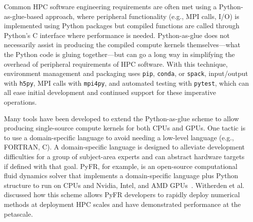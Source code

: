 Common HPC software engineering requirements are often met using a Python-as-glue-based approach, where peripheral functionality (e.g., MPI calls, I/O) is implemented using Python packages but compiled functions are called through Python's C interface where performance is needed.
Python-as-glue does not necessarily assist in producing the compiled compute kernels themselves---what the Python code is gluing together---but can go a long way in simplifying the overhead of peripheral requirements of HPC software.
With this technique, environment management and packaging uses \texttt{pip}, \texttt{conda}, or \texttt{spack}, input/output with \texttt{h5py}, MPI calls with \texttt{mpi4py}, 
and automated testing with \texttt{pytest}, which can all ease initial development and continued support for these imperative operations. 

Many tools have been developed to extend the Python-as-glue scheme to allow producing single-source compute kernels for both CPUs and GPUs.
One tactic is to use a domain-specific language to avoid needing a low-level language (e.g., FORTRAN, C).
A domain-specific language is designed to alleviate development difficulties for a group of subject-area experts and can abstract hardware targets if defined with that goal.
PyFR, for example, is an open-source computational fluid dynamics solver that implements a domain-specific language plus Python structure to run on CPUs and Nvidia, Intel, and AMD GPUs~\cite{pyfrPetascale}. 
Witherden et al.~\cite{pyfrPetascale} discussed how this scheme allows PyFR developers to rapidly deploy numerical methods at deployment HPC scales and have demonstrated performance at the petascale.

